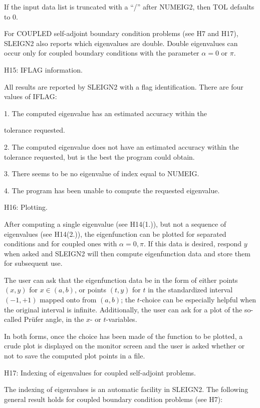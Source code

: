 \documentclass[12pt]{amsart}%
\theoremstyle{plain}
\numberwithin{equation}{section}
\numberwithin{theorem}{section}
\begin{document}
If the input data list is truncated with a ``\thinspace/\thinspace'' after
NUMEIG2, then TOL defaults to 0.

For COUPLED self-adjoint boundary condition problems (see H7 and H17), SLEIGN2
also reports which eigenvalues are double. Double eigenvalues can occur only
for coupled boundary conditions with the parameter $\alpha=0$ or $\pi.$

\medskip

H15: IFLAG information.

All results are reported by SLEIGN2 with a flag identification. There are four
values of IFLAG:

1. The computed eigenvalue has an estimated accuracy within the

tolerance requested.

2. The computed eigenvalue does not have an estimated accuracy within the
tolerance requested, but is the best the program could obtain.

3. There seems to be no eigenvalue of index equal to NUMEIG.

4. The program has been unable to compute the requested eigenvalue.

\medskip

H16: Plotting.

After computing a single eigenvalue (see H14(1.)), but not a sequence of
eigenvalues (see H14(2.)), the eigenfunction can be plotted for separated
conditions and for coupled ones with $\alpha=0,\pi.$ If this data is desired,
respond $y$ when asked and SLEIGN2 will then compute eigenfunction data and
store them for subsequent use.

The user can ask that the eigenfunction data be in the form of either points
$(x,y)$ for $x\in(a,b)$, or points $(t,y)$ for $t$ in the standardized
interval $(-1,+1)$ mapped onto from $(a,b)$; the $t$-choice can be especially
helpful when the original interval is infinite. Additionally, the user can ask
for a plot of the so-called Pr\"{u}fer angle, in the $x$- or $t$-variables.

In both forms, once the choice has been made of the function to be plotted, a
crude plot is displayed on the monitor screen and the user is asked whether or
not to save the computed plot points in a file.

\medskip

H17: Indexing of eigenvalues for coupled self-adjoint problems.

The indexing of eigenvalues is an automatic facility in SLEIGN2. The following
general result holds for coupled boundary condition problems (see H7):
\end{document}
